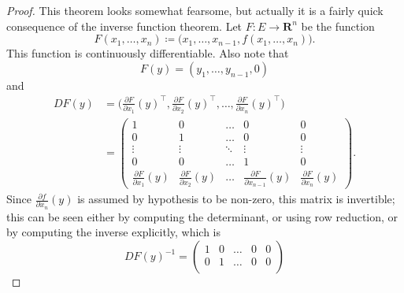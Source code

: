 \begin{proof}
    This theorem looks somewhat fearsome, but actually it is a fairly quick consequence of the inverse function theorem.
    Let \(F : E \to \mathbf{R}^n\) be the function
    \[
        F(x_1, \dots, x_n) \coloneqq \big(x_1, \dots, x_{n - 1}, f(x_1, \dots, x_n)\big).
    \]
    This function is continuously differentiable.
    Also note that
    \[
        F(y) = (y_1, \dots, y_{n - 1}, 0)
    \]
    and
    \begin{align*}
        D F(y) & = \bigg(\frac{\partial F}{\partial x_1}(y)^\top, \frac{\partial F}{\partial x_2}(y)^\top, \dots, \frac{\partial F}{\partial x_n}(y)^\top\bigg) \\
               & = \begin{pmatrix}
            1                                  & 0                                  & \dots  & 0                                        & 0                                  \\
            0                                  & 1                                  & \dots  & 0                                        & 0                                  \\
            \vdots                             & \vdots                             & \ddots & \vdots                                   & \vdots                             \\
            0                                  & 0                                  & \dots  & 1                                        & 0                                  \\
            \frac{\partial F}{\partial x_1}(y) & \frac{\partial F}{\partial x_2}(y) & \dots  & \frac{\partial F}{\partial x_{n - 1}}(y) & \frac{\partial F}{\partial x_n}(y)
        \end{pmatrix}.
    \end{align*}
    Since \(\frac{\partial f}{\partial x_n}(y)\) is assumed by hypothesis to be non-zero, this matrix is invertible;
    this can be seen either by computing the determinant, or using row reduction, or by computing the inverse explicitly, which is
    \[
        D F(y)^{-1} = \begin{pmatrix}
            1                                       & 0                                       & \dots  & 0                                             & 0      \\
            0                                       & 1                                       & \dots  & 0                                             & 0      \\

\end{pmatrix}\]
\end{proof}
